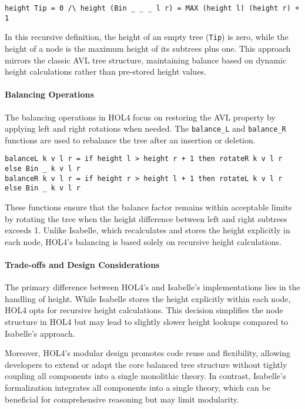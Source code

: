 \documentclass[12pt]{article}
\begin{document}
\begin{verbatim}
height Tip = 0 /\ height (Bin _ _ _ l r) = MAX (height l) (height r) + 1
\end{verbatim}

In this recursive definition, the height of an empty tree (\texttt{Tip}) is zero, while the height of a node is the maximum height of its subtrees plus one. This approach mirrors the classic AVL tree structure, maintaining balance based on dynamic height calculations rather than pre-stored height values.

\paragraph{Balancing Operations}
The balancing operations in HOL4 focus on restoring the AVL property by applying left and right rotations when needed. The \texttt{balance\_L} and \texttt{balance\_R} functions are used to rebalance the tree after an insertion or deletion.

\begin{verbatim}
balanceL k v l r = if height l > height r + 1 then rotateR k v l r else Bin _ k v l r
balanceR k v l r = if height r > height l + 1 then rotateL k v l r else Bin _ k v l r
\end{verbatim}

These functions ensure that the balance factor remains within acceptable limits by rotating the tree when the height difference between left and right subtrees exceeds 1. Unlike Isabelle, which recalculates and stores the height explicitly in each node, HOL4’s balancing is based solely on recursive height calculations.

\paragraph{Trade-offs and Design Considerations}
The primary difference between HOL4’s and Isabelle’s implementations lies in the handling of height. While Isabelle stores the height explicitly within each node, HOL4 opts for recursive height calculations. This decision simplifies the node structure in HOL4 but may lead to slightly slower height lookups compared to Isabelle’s approach.

Moreover, HOL4's modular design promotes code reuse and flexibility, allowing developers to extend or adapt the core balanced tree structure without tightly coupling all components into a single monolithic theory. In contrast, Isabelle's formalization integrates all components into a single theory, which can be beneficial for comprehensive reasoning but may limit modularity.
\end{document}
